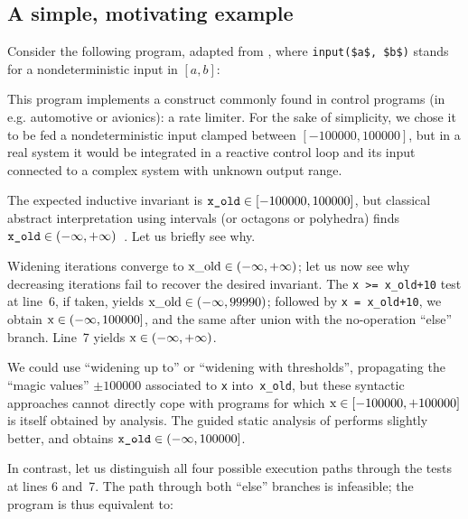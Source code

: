 \documentclass[preprint]{sigplanconf}
\begin{document}
\subsection{A simple, motivating example}
\label{subsec:rate_lim}
Consider the following program, adapted from \cite{Monniaux_Gonnord_SAS11}, where \lstinline|input($a$, $b$)| stands for a nondeterministic input in $[a,b]$:

This program implements a construct commonly found in control programs (in e.g. automotive or avionics): a rate limiter. For the sake of simplicity, we chose it to be fed a nondeterministic input clamped between $[-100000,100000]$, but in a real system it would be integrated in a reactive control loop and its input connected to a complex system with unknown output range.

The expected inductive invariant is $\verb|x_old| \in [-100000,100000]$, but classical abstract interpretation using intervals (or octagons or polyhedra) finds $\verb|x_old| \in (-\infty,+\infty)$~\citep{ASTREE_ESOP05}.
Let us briefly see why.

Widening iterations converge to $\lstinline|x_old| \in (-\infty,+\infty)$; let us now see why decreasing iterations fail to recover the desired invariant.
The \lstinline|x >= x_old+10| test at line~6, if taken, yields $\lstinline|x_old| \in (-\infty,99990)$; followed by \lstinline|x = x_old+10|, we obtain $\lstinline|x| \in (-\infty,\allowbreak 100000]$, and the same after union with the no-operation ``else'' branch. Line~7 yields $\lstinline|x| \in (-\infty,+\infty)$.

We could use ``widening up to'' or ``widening with thresholds'', propagating the ``magic values'' $\pm 100000$ associated to \lstinline|x| into~\lstinline|x_old|, but these syntactic approaches cannot directly cope with programs for which $\lstinline|x|  \in [-100000,+100000]$ is itself obtained by analysis.
The guided static analysis of \citet{DBLP:conf/sas/GopanR07} performs slightly better, and obtains $\verb|x_old| \in (-\infty,100000]$.

In contrast, let us distinguish all four possible execution paths through the tests at lines 6 and~7. The path through both ``else'' branches is infeasible; the program is thus equivalent to:

\end{document}
